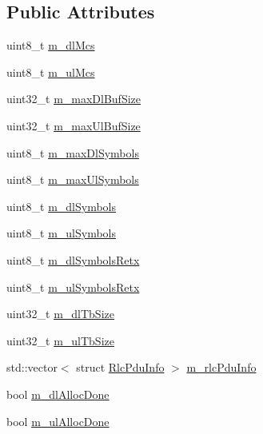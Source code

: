 \subsection*{Public Attributes}
\begin{DoxyCompactItemize}
\item 
uint8\+\_\+t \hyperlink{structns3_1_1MmWaveFlexTtiMacScheduler_1_1UeSchedInfo_a04533eb36faae5d83ba722b9fae16f20}{m\+\_\+dl\+Mcs}
\item 
uint8\+\_\+t \hyperlink{structns3_1_1MmWaveFlexTtiMacScheduler_1_1UeSchedInfo_a837621e87ee1c33cc7f3dc59e2722a05}{m\+\_\+ul\+Mcs}
\item 
uint32\+\_\+t \hyperlink{structns3_1_1MmWaveFlexTtiMacScheduler_1_1UeSchedInfo_ac928aeae2f2954738bc1e91149f71590}{m\+\_\+max\+Dl\+Buf\+Size}
\item 
uint32\+\_\+t \hyperlink{structns3_1_1MmWaveFlexTtiMacScheduler_1_1UeSchedInfo_a768834a93b7805f8eb910d1863474281}{m\+\_\+max\+Ul\+Buf\+Size}
\item 
uint8\+\_\+t \hyperlink{structns3_1_1MmWaveFlexTtiMacScheduler_1_1UeSchedInfo_a53c3170d1281fb6214d554df176d496f}{m\+\_\+max\+Dl\+Symbols}
\item 
uint8\+\_\+t \hyperlink{structns3_1_1MmWaveFlexTtiMacScheduler_1_1UeSchedInfo_a30cabcd573ea75fa0b8ab1cf95bdc75a}{m\+\_\+max\+Ul\+Symbols}
\item 
uint8\+\_\+t \hyperlink{structns3_1_1MmWaveFlexTtiMacScheduler_1_1UeSchedInfo_a550155d631303d4b554cdd4b7d8d6dd5}{m\+\_\+dl\+Symbols}
\item 
uint8\+\_\+t \hyperlink{structns3_1_1MmWaveFlexTtiMacScheduler_1_1UeSchedInfo_ae161e145047db427109bffd092fba99e}{m\+\_\+ul\+Symbols}
\item 
uint8\+\_\+t \hyperlink{structns3_1_1MmWaveFlexTtiMacScheduler_1_1UeSchedInfo_a594ee1ea81d5f803439b02b5f87ea0f3}{m\+\_\+dl\+Symbols\+Retx}
\item 
uint8\+\_\+t \hyperlink{structns3_1_1MmWaveFlexTtiMacScheduler_1_1UeSchedInfo_ac7a566008965f549c346852efdeabd48}{m\+\_\+ul\+Symbols\+Retx}
\item 
uint32\+\_\+t \hyperlink{structns3_1_1MmWaveFlexTtiMacScheduler_1_1UeSchedInfo_af3424ec1e75d305cf54664ec21257eb7}{m\+\_\+dl\+Tb\+Size}
\item 
uint32\+\_\+t \hyperlink{structns3_1_1MmWaveFlexTtiMacScheduler_1_1UeSchedInfo_a225203cbc3b2acc36c990e7b1b664833}{m\+\_\+ul\+Tb\+Size}
\item 
std\+::vector$<$ struct \hyperlink{structns3_1_1RlcPduInfo}{Rlc\+Pdu\+Info} $>$ \hyperlink{structns3_1_1MmWaveFlexTtiMacScheduler_1_1UeSchedInfo_ad6d8a0254cacda798a9e603c7b849a23}{m\+\_\+rlc\+Pdu\+Info}
\item 
bool \hyperlink{structns3_1_1MmWaveFlexTtiMacScheduler_1_1UeSchedInfo_a65eb31d310ba9b57828508f2d35fb156}{m\+\_\+dl\+Alloc\+Done}
\item 
bool \hyperlink{structns3_1_1MmWaveFlexTtiMacScheduler_1_1UeSchedInfo_a3a0b96f89a93cda3d9a2fff785bd560f}{m\+\_\+ul\+Alloc\+Done}
\end{DoxyCompactItemize}


